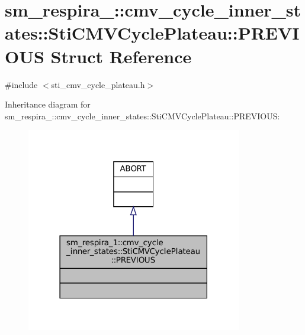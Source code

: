 \hypertarget{structsm__respira__1_1_1cmv__cycle__inner__states_1_1StiCMVCyclePlateau_1_1PREVIOUS}{}\section{sm\+\_\+respira\+\_\+:\+:cmv\+\_\+cycle\+\_\+inner\+\_\+states\+:\+:Sti\+C\+M\+V\+Cycle\+Plateau\+:\+:P\+R\+E\+V\+I\+O\+US Struct Reference}
\label{structsm__respira__1_1_1cmv__cycle__inner__states_1_1StiCMVCyclePlateau_1_1PREVIOUS}


{\ttfamily \#include $<$sti\+\_\+cmv\+\_\+cycle\+\_\+plateau.\+h$>$}



Inheritance diagram for sm\+\_\+respira\+\_\+:\+:cmv\+\_\+cycle\+\_\+inner\+\_\+states\+:\+:Sti\+C\+M\+V\+Cycle\+Plateau\+:\+:P\+R\+E\+V\+I\+O\+US\+:
\nopagebreak
\begin{figure}[H]
\begin{center}
\leavevmode
\includegraphics[width=266pt]{structsm__respira__1_1_1cmv__cycle__inner__states_1_1StiCMVCyclePlateau_1_1PREVIOUS__inherit__graph}
\end{center}
\end{figure}


